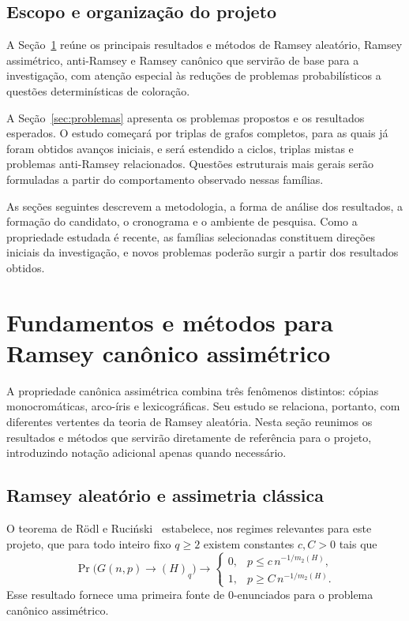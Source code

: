 \documentclass[11pt,a4paper]{article}
\newcommand{\Gnp}{G(n,p)}
\theoremstyle{plain}
\theoremstyle{definition}
\begin{document}
\subsection{Escopo e organização do projeto}
\label{sec:escopo}


A Seção~\ref{sec:conhecidos} reúne os principais resultados e métodos de Ramsey
aleatório, Ramsey assimétrico, anti-Ramsey e Ramsey canônico que servirão de
base para a investigação, com atenção especial às reduções de problemas
probabilísticos a questões determinísticas de coloração.

A Seção~\ref{sec:problemas} apresenta os problemas propostos e os resultados
esperados. O estudo começará por triplas de grafos completos, para as quais já
foram obtidos avanços iniciais, e será estendido a ciclos, triplas mistas e
problemas anti-Ramsey relacionados. Questões estruturais mais gerais serão
formuladas a partir do comportamento observado nessas famílias.

As seções seguintes descrevem a metodologia, a forma de análise dos resultados,
a formação do candidato, o cronograma e o ambiente de pesquisa. Como a
propriedade estudada é recente, as famílias selecionadas constituem direções
iniciais da investigação, e novos problemas poderão surgir a partir dos
resultados obtidos.


\section{Fundamentos e métodos para Ramsey canônico assimétrico}
\label{sec:conhecidos}


A propriedade canônica assimétrica combina três fenômenos distintos:
cópias monocromáticas, arco-íris e lexicográficas. Seu estudo se
relaciona, portanto, com diferentes vertentes da teoria de Ramsey
aleatória. Nesta seção reunimos os resultados e métodos que servirão
diretamente de referência para o projeto, introduzindo notação
adicional apenas quando necessário.


\subsection{Ramsey aleatório e assimetria clássica}


O teorema de Rödl e Ruciński~\cite{RR} estabelece, nos regimes
relevantes para este projeto, que para todo inteiro fixo $q\ge2$
existem constantes $c,C>0$ tais que
\[
  \Pr\bigl(\Gnp\longrightarrow(H)_q\bigr)
  \longrightarrow
  \begin{cases}
    0, & p\le c\,n^{-1/m_2(H)}, \\
    1, & p\ge C\,n^{-1/m_2(H)}.
  \end{cases}
\]
Esse resultado fornece uma primeira fonte de $0$-enunciados para o
problema canônico assimétrico.
\end{document}
